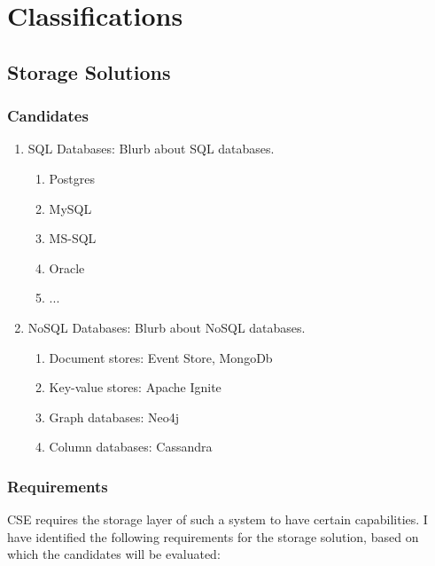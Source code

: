 %
\chapter{Classifications}
\label{sec:classifications}

\section{Storage Solutions}
\label{sec:system:storage}

\subsection{Candidates}

\begin{enumerate}
\item SQL Databases: Blurb about SQL databases.
\begin{enumerate}
\item Postgres
\item MySQL
\item MS-SQL
\item Oracle
\item ...
\end{enumerate}
\item NoSQL Databases: Blurb about NoSQL databases.\cite{strauch2011nosql}
\begin{enumerate}
\item Document stores: Event Store, MongoDb
\item Key-value stores: Apache Ignite
\item Graph databases: Neo4j
\item Column databases: Cassandra
\end{enumerate}
\end{enumerate}
\subsection{Requirements}

\ac{CSE} requires the storage layer of such a system to have certain capabilities.
I have identified the following requirements for the storage solution, based on which the candidates will be evaluated:


